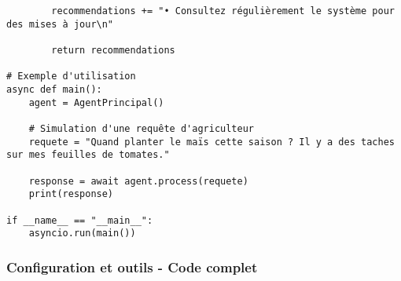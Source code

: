 \begin{verbatim}
        recommendations += "• Consultez régulièrement le système pour des mises à jour\n"

        return recommendations

# Exemple d'utilisation
async def main():
    agent = AgentPrincipal()

    # Simulation d'une requête d'agriculteur
    requete = "Quand planter le maïs cette saison ? Il y a des taches sur mes feuilles de tomates."

    response = await agent.process(requete)
    print(response)

if __name__ == "__main__":
    asyncio.run(main())
\end{verbatim}

\subsubsection{Configuration et outils - Code complet}
